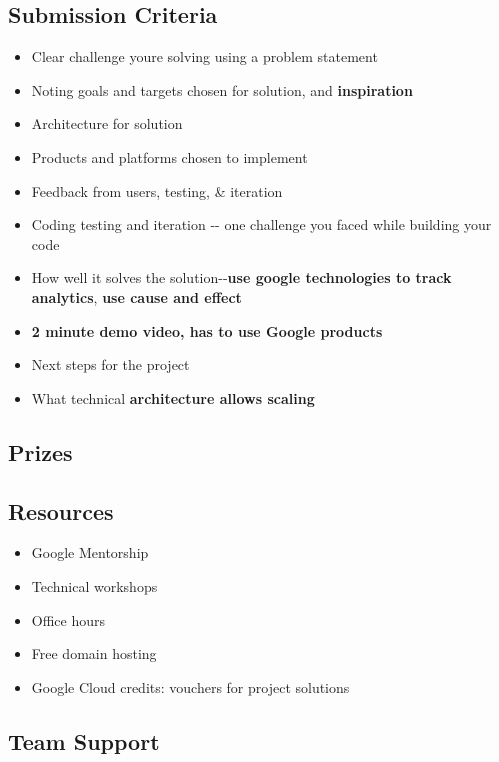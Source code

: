 \documentclass[
]{article}
\providecommand{\tightlist}{%
  \setlength{\itemsep}{0pt}\setlength{\parskip}{0pt}}
\begin{document}
\subsection{Submission Criteria}\label{submission-criteria}

\begin{itemize}
\tightlist
\item
  Clear challenge you\textquotesingle re solving using a problem
  statement
\item
  Noting goals and targets chosen for solution, and \textbf{inspiration}
\item
  Architecture for solution
\item
  Products and platforms chosen to implement
\item
  Feedback from users, testing, \& iteration
\item
  Coding testing and iteration -\/- one challenge you faced while
  building your code
\item
  How well it solves the solution-\/-\textbf{use google technologies to
  track analytics}, \textbf{use cause and effect}
\item
  \textbf{2 minute demo video, has to use Google products}
\item
  Next steps for the project
\item
  What technical \textbf{architecture allows scaling}
\end{itemize}

\subsection{Prizes}\label{prizes}

\subsection{Resources}\label{resources}

\begin{itemize}
\item
  Google Mentorship
\item
  Technical workshops
\item
  Office hours
\item
  Free domain hosting
\item
  Google Cloud credits: vouchers for project solutions
\end{itemize}

\subsection{Team Support}\label{team-support}
\end{document}
